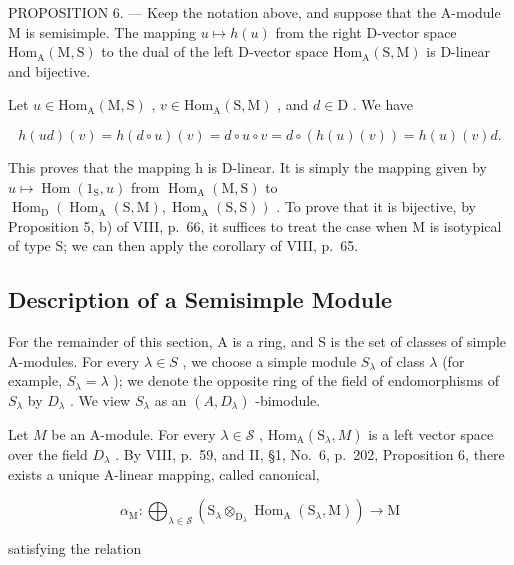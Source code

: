 PROPOSITION 6. --- Keep the notation above, and suppose that the A-module M is semisimple. The mapping \(u \mapsto h(u)\) from the right D-vector space \(\mathrm{Hom}_{\mathrm{A}}(\mathrm{M},\mathrm{S})\) to the dual of the left D-vector space \(\mathrm{Hom}_{\mathrm{A}}(\mathrm{S},\mathrm{M})\) is D-linear and bijective.

Let \(u \in \mathrm{Hom}_{\mathrm{A}}(\mathrm{M}, \mathrm{S})\) , \(v \in \mathrm{Hom}_{\mathrm{A}}(\mathrm{S}, \mathrm{M})\) , and \(d \in \mathrm{D}\) . We have

\[
h (u d) (v) = h (d \circ u) (v) = d \circ u \circ v = d \circ (h (u) (v)) = h (u) (v) d.
\]

This proves that the mapping h is D-linear. It is simply the mapping given by \(u \mapsto \operatorname{Hom}(1_{\mathrm{S}}, u)\) from \(\operatorname{Hom}_{\mathrm{A}}(\mathrm{M}, \mathrm{S})\) to \(\operatorname{Hom}_{\mathrm{D}}(\operatorname{Hom}_{\mathrm{A}}(\mathrm{S}, \mathrm{M}), \operatorname{Hom}_{\mathrm{A}}(\mathrm{S}, \mathrm{S}))\) . To prove that it is bijective, by Proposition 5, b) of VIII, p.~66, it suffices to treat the case when M is isotypical of type S; we can then apply the corollary of VIII, p.~65.

\subsection{Description of a Semisimple Module}

For the remainder of this section, A is a ring, and S is the set of classes of simple A-modules. For every \(\lambda \in S\) , we choose a simple module \(S_{\lambda}\) of class \(\lambda\) (for example, \(S_{\lambda} = \lambda\) ); we denote the opposite ring of the field of endomorphisms of \(S_{\lambda}\) by \(D_{\lambda}\) . We view \(S_{\lambda}\) as an \((A, D_{\lambda})\) -bimodule.

Let \(M\) be an A-module. For every \(\lambda \in \mathcal{S}\) , \(\mathrm{Hom}_{\mathrm{A}}(\mathrm{S}_{\lambda}, M)\) is a left vector space over the field \(D_{\lambda}\) . By VIII, p.~59, and II, §1, No.~6, p.~202, Proposition 6, there exists a unique A-linear mapping, called canonical,

\[
\alpha_ {\mathrm{M}}: \bigoplus_ {\lambda \in \mathcal {S}} \left(\mathrm{S} _ {\lambda} \otimes_ {\mathrm{D} _ {\lambda}} \operatorname{Hom} _ {\mathrm{A}} (\mathrm{S} _ {\lambda}, \mathrm{M})\right) \to \mathrm{M}
\]

satisfying the relation

